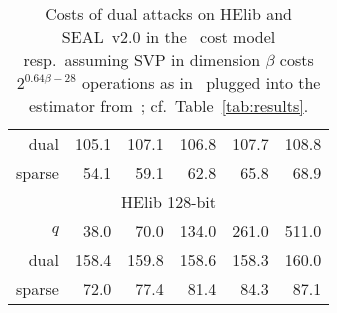 \documentclass[a4paper]{llncs}
\begin{document}
\begin{table}[h]
\begin{center}
\begin{tabular}{rrrrrr}
      dual   & 105.1 &  107.1 &  106.8 &  107.7 &  108.8\\
      sparse &  54.1 &   59.1 &   62.8 &   65.8 &   68.9\\
      \midrule
      \multicolumn{6}{c}{HElib 128-bit}\\
      $q$    & 38.0  &   70.0 &  134.0 &  261.0 &  511.0\\
      dual   & 158.4 &  159.8 &  158.6 &  158.3 &  160.0\\
      sparse & 72.0 &   77.4 &   81.4 &   84.3 &   87.1\\
    \end{tabular}
  \end{center}
  \caption{Costs of dual attacks on HElib and SEAL~v2.0 in the~\cite{RSA:LinPei11} cost model resp.\ assuming SVP in dimension \(\beta\) costs \(2^{0.64\beta -28}\) operations as in~\cite{AFRICACRYPT:LepNae14} plugged into the estimator from~\cite{JMC:AlbPlaSco15}; cf.~Table~\ref{tab:results}.}\label{tab:results-alt}
\end{table}
\end{document}
